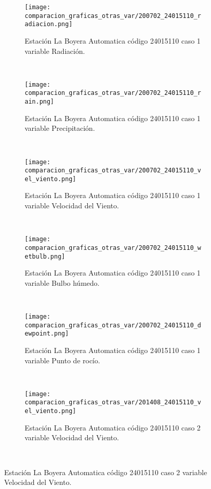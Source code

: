 \begin{figure}[H]
\centering
\begin{subfigure}[normla]{0.4\textwidth}
\caption{Estación La Boyera Automatica código 24015110 caso 1 variable Radiación.}
\texttt{[image: comparacion\_graficas\_otras\_var/200702\_24015110\_radiacion.png]}
\end{subfigure}
~
\begin{subfigure}[normla]{0.4\textwidth}
\caption{Estación La Boyera Automatica código 24015110 caso 1 variable Precipitación.}
\texttt{[image: comparacion\_graficas\_otras\_var/200702\_24015110\_rain.png]}
\end{subfigure}
~
\begin{subfigure}[normla]{0.4\textwidth}
\caption{Estación La Boyera Automatica código 24015110 caso 1 variable Velocidad del Viento.}
\texttt{[image: comparacion\_graficas\_otras\_var/200702\_24015110\_vel\_viento.png]}
\end{subfigure}
~
\begin{subfigure}[normla]{0.4\textwidth}
\caption{Estación La Boyera Automatica código 24015110 caso 1 variable Bulbo húmedo.}
\texttt{[image: comparacion\_graficas\_otras\_var/200702\_24015110\_wetbulb.png]}
\end{subfigure}
~
\begin{subfigure}[normla]{0.4\textwidth}
\caption{Estación La Boyera Automatica código 24015110 caso 1 variable Punto de rocío.}
\texttt{[image: comparacion\_graficas\_otras\_var/200702\_24015110\_dewpoint.png]}
\end{subfigure}
~
\begin{subfigure}[normla]{0.4\textwidth}
\caption{Estación La Boyera Automatica código 24015110 caso 2 variable Velocidad del Viento.}
\texttt{[image: comparacion\_graficas\_otras\_var/201408\_24015110\_vel\_viento.png]}
\end{subfigure}
~
\end{figure}
           
